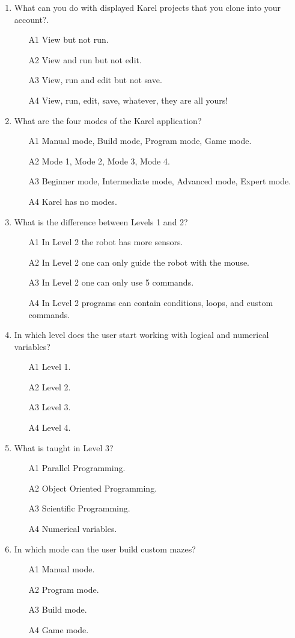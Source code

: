 \begin{enumerate}
\item What can you do with displayed Karel projects that you clone into your account?.
\begin{enumerate}
\item[A1] View but not run.
\item[A2] View and run but not edit.
\item[A3] View, run and edit but not save.
\item[A4] View, run, edit, save, whatever, they are all yours!
\end{enumerate}
\item What are the four modes of the Karel application?
\begin{enumerate}
\item[A1] Manual mode, Build mode, Program mode, Game mode.
\item[A2] Mode 1, Mode 2, Mode 3, Mode 4.
\item[A3] Beginner mode, Intermediate mode, Advanced mode, Expert mode.
\item[A4] Karel has no modes.
\end{enumerate}
\item What is the difference between Levels 1 and 2?
\begin{enumerate}
\item[A1] In Level 2 the robot has more sensors. 
\item[A2] In Level 2 one can only guide the robot with the mouse.
\item[A3] In Level 2 one can only use 5 commands.
\item[A4] In Level 2 programs can contain conditions, loops, and custom commands. 
\end{enumerate}
\item In which level does the user start working with logical and numerical variables?
\begin{enumerate}
\item[A1] Level 1.
\item[A2] Level 2.
\item[A3] Level 3.
\item[A4] Level 4.
\end{enumerate}
\item What is taught in Level 3?
\begin{enumerate}
\item[A1] Parallel Programming.
\item[A2] Object Oriented Programming.
\item[A3] Scientific Programming.
\item[A4] Numerical variables.
\end{enumerate}
\item In which mode can the user build custom mazes?
\begin{enumerate}
\item[A1] Manual mode.
\item[A2] Program mode.
\item[A3] Build mode.
\item[A4] Game mode.
\end{enumerate}
\end{enumerate}

